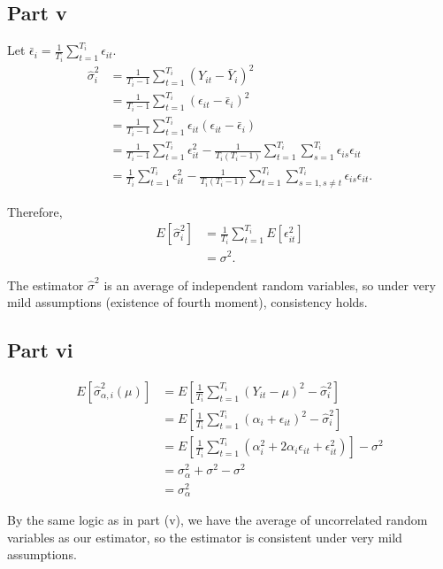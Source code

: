 \documentclass[11pt]{article} %
\begin{document}
\subsection{Part v}
Let $\bar{\epsilon}_i = \frac{1}{T_i}\sum_{t=1}^{T_i}\epsilon_{it}$.
\begin{align*}
\hat{\sigma}^2_i &= \frac{1}{T_i - 1}\sum_{t=1}^{T_i}(Y_{it} -\bar{Y}_i)^2\\
&= \frac{1}{T_i - 1}\sum_{t=1}^{T_i}(\epsilon_{it} -\bar{\epsilon}_i)^2 \\
&= \frac{1}{T_i - 1}\sum_{t=1}^{T_i}\epsilon_{it}(\epsilon_{it} -\bar{\epsilon}_i)\\
&= \frac{1}{T_i - 1}\sum_{t=1}^{T_i}\epsilon_{it}^2 - \frac{1}{T_i(T_i - 1)}\sum_{t=1}^{T_i}\sum_{s=1}^{T_i}\epsilon_{is}\epsilon_{it}\\
&= \frac{1}{T_i }\sum_{t=1}^{T_i}\epsilon_{it}^2 - \frac{1}{T_i(T_i - 1)}\sum_{t=1}^{T_i}\sum_{s=1,s\neq t}^{T_i}\epsilon_{is}\epsilon_{it}.
\end{align*}

Therefore,
\begin{align*}
E[\hat{\sigma}^2_i] &= \frac{1}{T_i }\sum_{t=1}^{T_i}E[\epsilon_{it}^2]\\
&= \sigma^2.
\end{align*}

The estimator $\hat{\sigma}^2$ is an average of independent random variables, so under very mild assumptions (existence of fourth moment), consistency holds.
\subsection{Part vi}

\begin{align*}
E[\hat{\sigma}^2_{\alpha,i}(\mu)] &= E\left[\frac{1}{T_i}\sum_{t=1}^{T_i}(Y_{it} -\mu)^2 - \hat{\sigma}_i^2\right]\\
&=  E\left[\frac{1}{T_i}\sum_{t=1}^{T_i}(\alpha_{i} + \epsilon_{it})^2 - \hat{\sigma}_i^2\right]\\
&= E\left[\frac{1}{T_i}\sum_{t=1}^{T_i}(\alpha_{i}^2 +2 \alpha_i\epsilon_{it} + \epsilon_{it}^2)\right] - \sigma^2\\
&= \sigma^2_{\alpha} + \sigma^2 - \sigma^2\\
&= \sigma^2_{\alpha}
\end{align*}

By the same logic as in part (v), we have the average of uncorrelated random variables as our estimator, so the estimator is consistent under very mild assumptions.
\end{document}
